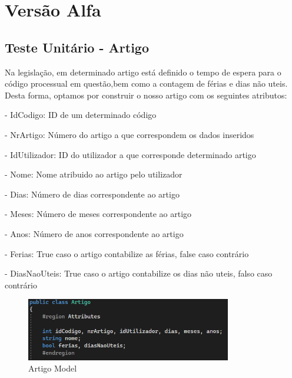 \section{Versão Alfa}
\subsection{Teste Unitário - Artigo}
\indent \par Na legislação, em determinado artigo está definido o tempo de espera para o código processual em questão,bem como a contagem de férias e dias não uteis. Desta forma, optamos por construir o nosso artigo com os seguintes atributos:
\indent \par - IdCodigo: ID de um determinado código
\indent \par - NrArtigo: Número do artigo a que correspondem os dados inseridos
\indent \par - IdUtilizador: ID do utilizador a que corresponde determinado artigo
\indent \par - Nome: Nome atribuido ao artigo pelo utilizador
\indent \par - Dias: Número de dias correspondente ao artigo
\indent \par - Meses: Número de meses correspondente ao artigo
\indent \par - Anos: Número de anos correspondente ao artigo
\indent \par - Ferias: True caso o artigo contabilize as férias, false caso contrário
\indent \par - DiasNaoUteis: True caso o artigo contabilize os dias não uteis, falso caso contrário

\begin{figure}[!h]
\centering
\includegraphics[width=0.8\textwidth]{Figuras/Models/ArtigoModel.png}
\caption{Artigo Model}
\label{d.model}
\end{figure}

